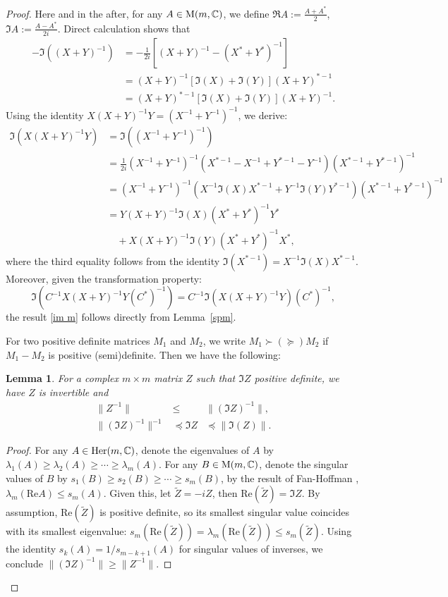 \documentclass[11pt]{amsart}
\newtheorem{lemma}[theorem]{Lemma}
\theoremstyle{remark}
\theoremstyle{definition}
\newcommand{\C}{{\mathbf C}}
\def \C{{\mathcal{C}}}
\def\C{{\mathbb C}}
\begin{document}
\begin{proof}
Here and in the after, for any $A\in{\rm M}(m,\C)$, we define
$\Re A:=\frac{A+A^*}{2}$,$\Im A:=\frac{A-A^*}{2i}$.
Direct calculation shows that
\begin{align*}
-\Im\left((X+Y)^{-1}\right) 
&= -\frac{1}{2i}\left[(X+Y)^{-1} - (X^*+Y^*)^{-1}\right] \\
&= (X+Y)^{-1}\left[\Im(X) + \Im(Y)\right](X+Y)^{*-1} \\
&= (X+Y)^{*-1}\left[\Im(X) + \Im(Y)\right](X+Y)^{-1}.
\end{align*}
Using the identity \( X(X+Y)^{-1}Y = (X^{-1} + Y^{-1})^{-1} \), we derive:
\begin{align*}
\Im\left(X(X+Y)^{-1}Y\right) 
&= \Im\left((X^{-1} + Y^{-1})^{-1}\right) \\
&= \frac{1}{2i}(X^{-1} + Y^{-1})^{-1}\left(X^{*-1} - X^{-1} + Y^{*-1} - Y^{-1}\right)(X^{*-1} + Y^{*-1})^{-1} \\
&= (X^{-1} + Y^{-1})^{-1} (X^{-1}\Im (X) X^{*-1}+ Y^{-1}\Im (Y) Y^{*-1})(X^{*-1} + Y^{*-1})^{-1}\\
&= Y(X+Y)^{-1}\Im(X)(X^*+Y^*)^{-1}Y^* \\
&\quad + X(X+Y)^{-1}\Im(Y)(X^*+Y^*)^{-1}X^*,
\end{align*}
where the third equality follows from the identity $\Im (X^{*-1})= X^{-1}\Im (X) X^{*-1}.$ Moreover, given the transformation property:
\begin{equation*}
\Im\left(C^{-1}X(X+Y)^{-1}Y(C^*)^{-1}\right) = C^{-1}\Im\left(X(X+Y)^{-1}Y\right)(C^*)^{-1},
\end{equation*}
the result \eqref{im m} follows directly from Lemma~\ref{spm}.

For two positive definite matrices \( M_1 \) and \( M_2 \), we write \( M_1 \succ (\succcurlyeq) M_2 \) if \( M_1 - M_2 \) is positive (semi)definite. Then we have the following:
\begin{lemma}\label{later use}
For a complex $m\times m$ matrix $Z$ such that $\Im  Z$ positive definite, we have $Z$ is invertible and 
\begin{eqnarray}\label{imx-1}
\|Z^{-1}\| &\leq &  \|(\Im  Z)^{-1}\|,\\
\label{imx}  \|(\Im Z)^{-1}\|^{-1} &\preccurlyeq  \Im Z &\preccurlyeq \|\Im(Z)\| .
\end{eqnarray}
\end{lemma}

\begin{proof}
For any $A\in{\rm Her}(m,\C)$, denote the eigenvalues of $A$ by $\lambda_1(A) \geq \lambda_2(A)\geq \cdots \geq  \lambda_m(A)$. For any $B\in{\rm M}(m,\C)$, denote the singular values of 
$B$ by $s_1(B) \geq s_2(B)\geq \cdots \geq  s_m(B)$,
by the result of Fan-Hoffman \cite[Remark 1]{Fan}, $\lambda_m(\mathrm{Re}A)\leq s_m(A)$. Given this, let $\tilde{Z}=-iZ$, then  $\mathrm{Re}(\tilde{Z})=\Im  Z$. By assumption, $\mathrm{Re}(\tilde{Z})$ is positive definite, so its smallest singular value coincides with its smallest eigenvalue: $s_m(\mathrm{Re}(\tilde{Z}))=\lambda_m(\mathrm{Re}(\tilde{Z}))\leq s_m(\tilde{Z})$. 
Using the identity $s_k(A)=1/s_{m-k+1}(A)$ for singular values of inverses, we conclude  $\|(\Im  Z)^{-1}\|\geq\|Z^{-1}\|.$


\end{proof}
\end{proof}
\end{document}
